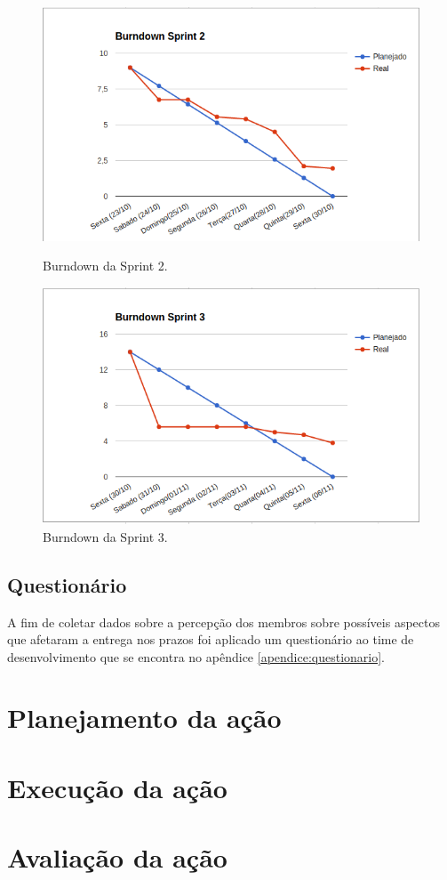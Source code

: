 	\begin{figure}[!h]
	\begin{minipage}[b]{0.5\linewidth} 
	\centering
	\includegraphics[scale=0.5]{figuras/burndown_sprint2.png}
	\caption{Burndown da Sprint 2.}
	\label{fig:burndown2}
	\end{minipage}
	\hspace{0.5cm} 
	\begin{minipage}[b]{0.5\linewidth}
	\centering
	\includegraphics[scale=0.5]{figuras/burndown_sprint3.png}
	\caption{Burndown da Sprint 3.}
	\label{fig:burndown3}
	\end{minipage}
	\end{figure}
	
	\pagebreak

	\subsection{Questionário}

	A fim de coletar dados sobre a percepção dos membros sobre possíveis aspectos que afetaram a entrega nos prazos foi aplicado
	um questionário ao time de desenvolvimento que se encontra no apêndice \ref{apendice:questionario}.



\section{Planejamento da ação}
\section{Execução da ação}
\section{Avaliação da ação}